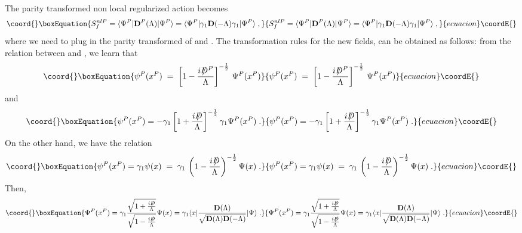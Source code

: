 \documentclass[a4paper,12pt]{article}
\providecommand{\Dcslash}{/\!\!\!\! D}
\begin{document}
The parity transformed non local regularized action becomes
\begin{equation}\coord{}\boxEquation{
S_f^{nlP}=\langle\Psi^P| {\mathbf D}^P(\Lambda) |\Psi^P\rangle = 
\langle\Psi^P| \gamma_1 {\mathbf D}(-\Lambda) \gamma_1|\Psi^P\rangle \;,
}{
S_f^{nlP}=\langle\Psi^P| {\mathbf D}^P(\Lambda) |\Psi^P\rangle = 
\langle\Psi^P| \gamma_1 {\mathbf D}(-\Lambda) \gamma_1|\Psi^P\rangle \;,
}{ecuacion}\coordE{}\end{equation}
where we need to plug in the parity transformed of \myHighlight{$\Psi$}\coordHE{} and
\myHighlight{${\bar\Psi}$}\coordHE{}. The transformation rules for the new fields, can be
obtained as follows: from the relation between \myHighlight{$\Psi$}\coordHE{} and \myHighlight{$\psi$}\coordHE{}, we
learn that
\begin{equation}\coord{}\boxEquation{
\psi^P(x^P) \;=\;
\left[1-\frac{i\,\Dcslash^P}{\Lambda}\right]^{-\frac{1}{2}}\,
\Psi^P(x^P)
}{
\psi^P(x^P) \;=\;
\left[1-\frac{i\,\Dcslash^P}{\Lambda}\right]^{-\frac{1}{2}}\,
\Psi^P(x^P)
}{ecuacion}\coordE{}\end{equation} 
and
\begin{equation}\coord{}\boxEquation{
\psi^P(x^P)=-\gamma_1 \left[1+\frac{i\,\Dcslash}{\Lambda}\right]^{-\frac{1}{2}}
\gamma_1\Psi^P(x^P) \;.
}{
\psi^P(x^P)=-\gamma_1 \left[1+\frac{i\,\Dcslash}{\Lambda}\right]^{-\frac{1}{2}}
\gamma_1\Psi^P(x^P) \;.
}{ecuacion}\coordE{}\end{equation}
On the other hand, we have the relation
\begin{equation}\coord{}\boxEquation{
\psi^P(x^P) = \gamma_1 \psi (x) \;=\;
\gamma_1 \,\left(1-\frac{i\,\Dcslash}{\Lambda}\right)^{-\frac{1}{2}}\Psi(x) \;.
}{
\psi^P(x^P) = \gamma_1 \psi (x) \;=\;
\gamma_1 \,\left(1-\frac{i\,\Dcslash}{\Lambda}\right)^{-\frac{1}{2}}\Psi(x) \;.
}{ecuacion}\coordE{}\end{equation}
Then,
\begin{equation}\coord{}\boxEquation{
\Psi^P(x^P)=\gamma_1\frac{\sqrt{1+\frac{i\,\Dcslash}{\Lambda}}}
{\sqrt{1-\frac{i\,\Dcslash}{\Lambda}}}\Psi(x)=\gamma_1\langle
x|\frac{{\mathbf D}(\Lambda)}
{\sqrt{{\mathbf D}(\Lambda){\mathbf D}(-\Lambda)}} |\Psi \rangle \;.
}{
\Psi^P(x^P)=\gamma_1\frac{\sqrt{1+\frac{i\,\Dcslash}{\Lambda}}}
{\sqrt{1-\frac{i\,\Dcslash}{\Lambda}}}\Psi(x)=\gamma_1\langle
x|\frac{{\mathbf D}(\Lambda)}
{\sqrt{{\mathbf D}(\Lambda){\mathbf D}(-\Lambda)}} |\Psi \rangle \;.
}{ecuacion}\coordE{}\end{equation}
\end{document}
